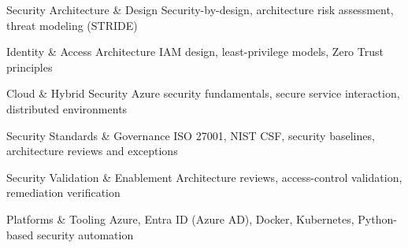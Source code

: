 


\begin{cvskills}

  \cvskill
    {Security Architecture \& Design}
    {Security-by-design, architecture risk assessment, threat modeling (STRIDE)}

  \cvskill
    {Identity \& Access Architecture}
    {IAM design, least-privilege models, Zero Trust principles}

  \cvskill
    {Cloud \& Hybrid Security}
    {Azure security fundamentals, secure service interaction,  distributed environments}

  \cvskill
    {Security Standards \& Governance}
    {ISO 27001, NIST CSF, security baselines, architecture reviews and exceptions}

  \cvskill
    {Security Validation \& Enablement}
    {Architecture reviews, access-control validation, remediation verification}

  \cvskill
    {Platforms \& Tooling}
    {Azure, Entra ID (Azure AD), Docker, Kubernetes, Python-based security automation}

\end{cvskills}







